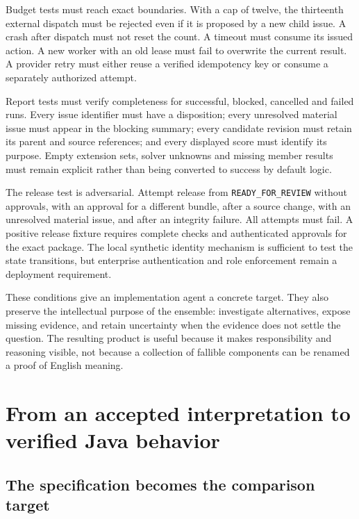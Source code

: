 \documentclass[12pt,a4paper,oneside,openany]{book}
\begin{document}
Budget tests must reach exact boundaries. With a cap of twelve, the thirteenth
external dispatch must be rejected even if it is proposed by a new child issue.
A crash after dispatch must not reset the count. A timeout must consume its
issued action. A new worker with an old lease must fail to overwrite the current
result. A provider retry must either reuse a verified idempotency key or consume
a separately authorized attempt.

Report tests must verify completeness for successful, blocked, cancelled and
failed runs. Every issue identifier must have a disposition; every unresolved
material issue must appear in the blocking summary; every candidate revision
must retain its parent and source references; and every displayed score must
identify its purpose. Empty extension sets, solver unknowns and missing member
results must remain explicit rather than being converted to success by default
logic.

The release test is adversarial. Attempt release from
\texttt{READY\_FOR\_REVIEW} without approvals, with an approval for a different
bundle, after a source change, with an unresolved material issue, and after an
integrity failure. All attempts must fail. A positive release fixture requires
complete checks and authenticated approvals for the exact package. The local
synthetic identity mechanism is sufficient to test the state transitions, but
enterprise authentication and role enforcement remain a deployment requirement.

These conditions give an implementation agent a concrete target. They also
preserve the intellectual purpose of the ensemble: investigate alternatives,
expose missing evidence, and retain uncertainty when the evidence does not settle
the question. The resulting product is useful because it makes responsibility
and reasoning visible, not because a collection of fallible components can be
renamed a proof of English meaning.


\chapter{From an accepted interpretation to verified Java behavior}
\label{ch:verification}

\section{The specification becomes the comparison target}
\label{merge:M07:00}
\end{document}
